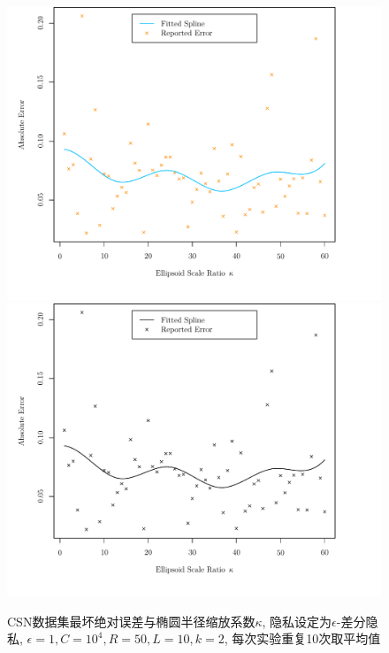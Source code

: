 \begin{figure}[hbtp]\centering
  \caption{CSN数据集最坏绝对误差与椭圆半径缩放系数$\kappa$, 隐私设定为$\epsilon$-差分隐私, $\epsilon = 1, C = 10^4, R = 50, L = 10, k = 2$,  每次实验重复10次取平均值}\label{fig:CSN数据集最坏绝对误差与椭圆半径缩放系数_kappa}
  \makeatletter
  \ifpkuthssextra@opt@colorlinks
  \includegraphics[width=140mm]{fig/fig_CSN.pdf}
  \else
  \includegraphics[width=140mm]{fig/fig_CSN_bw.pdf}
  \fi
  \makeatother
\end{figure}
